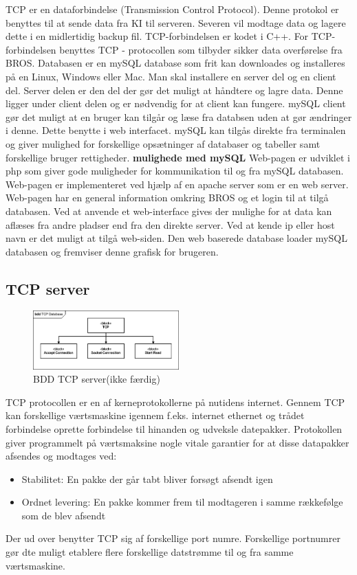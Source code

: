 TCP er en dataforbindelse (Transmission Control Protocol). Denne protokol er benyttes til at sende data fra KI til serveren. Severen vil modtage data og lagere dette i en midlertidig backup fil. TCP-forbindelsen er kodet i C++.
For TCP-forbindelsen benyttes TCP - protocollen som tilbyder sikker data overførelse fra BROS.
Databasen er en mySQL database som frit kan downloades og installeres på en Linux, Windows eller Mac.
Man skal installere en server del og en client del. Server delen er den del der gør det muligt at håndtere og lagre data. Denne ligger under client delen og er nødvendig for at client kan fungere. mySQL client gør det muligt at en bruger kan tilgår og læse fra databsen uden at gør ændringer i denne. Dette benytte i web interfacet. mySQL kan tilgås direkte fra terminalen og giver mulighed for forskellige opsætninger af databaser og tabeller samt forskellige bruger rettigheder.
\textbf{mulighede med mySQL}
Web-pagen er udviklet i php som giver gode muligheder for kommunikation til og fra mySQL databasen. Web-pagen er implementeret ved hjælp af en apache server som er en web server. Web-pagen har en general information omkring BROS og et login til at tilgå databasen. Ved at anvende et web-interface gives der mulighe for at data kan aflæses fra andre pladser end fra den direkte server. Ved at kende ip eller host navn er det muligt at tilgå web-siden.
Den web baserede database loader mySQL databasen og fremviser denne grafisk for brugeren.

\subsection{TCP server}
\begin{figure}[htbp]
	\centering
	\includegraphics[width=0.5\textwidth]{billeder/bdd_TCP_server}
	\caption{BDD TCP server(ikke færdig)}
	\label{fig:bdd_TCP_server}
\end{figure}



TCP protocollen er en af kerneprotokollerne på nutidens internet. Gennem TCP kan forskellige værtsmaskine igennem f.eks. internet ethernet og trådet forbindelse oprette forbindelse til hinanden og udveksle datepakker. Protokollen giver programmelt på værtsmaksine nogle vitale garantier for at disse datapakker afsendes og modtages ved:
\begin{itemize}
	\item Stabilitet: En pakke der går tabt bliver forsøgt afsendt igen
	\item Ordnet levering: En pakke kommer frem til modtageren i samme rækkefølge som de blev afsendt
\end{itemize}
Der ud over benytter TCP sig af forskellige port numre. Forskellige portnumrer gør dte muligt etablere flere forskellige datstrømme til og fra samme værtsmaskine.

